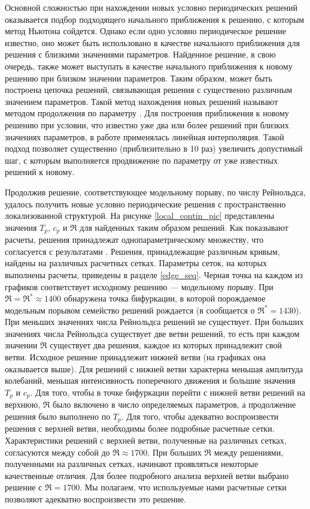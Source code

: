 Основной сложностью при нахождении новых условно периодических решений оказывается подбор подходящего начального приближения к решению, с которым метод Ньютона сойдется. Однако если одно условно периодическое решение известно, оно может быть использовано в качестве начального приближения для решения с близкими значениями параметров. Найденное решение, в свою очередь, также может выступать в качестве начального приближения к новому решению при близком значении параметров. Таким образом, может быть построена цепочка решений, связывающая решения с существенно различным значением параметров. Такой метод нахождения новых решений называют методом продолжения по параметру \cite{Viswanath2007, Dijkstra2014}. Для построения приближения к новому решению при условии, что известно уже два или более решений при близких значениях параметров, в работе применялась линейная интерполяция. Такой подход позволяет существенно (приблизительно в 10 раз) увеличить допустимый шаг, с которым выполняется продвижение по параметру от уже известных решений к новому. 

Продолжив решение, соответствующее модельному порыву, по числу Рейнольдса, удалось получить новые условно периодические решения с пространственно локализованной структурой. На рисунке \ref{local_contin_pic} представлены значения $T_p$, $c_p$ и $\Re$ для найденных таким образом решений. Как показывают расчеты, решения принадлежат однопараметрическому множеству, что согласуется с результатами \cite{Avila2013}. Решения, принадлежащие различным кривым, найдены на различных расчетных сетках. Параметры сеток, на которых выполнены расчеты, приведены в разделе \ref{edge_seq}. Черная точка на каждом из графиков соответствует исходному решению --- модельному порыву. При $\Re = \Re^* \approx 1400$ обнаружена точка бифуркации, в которой порождаемое модельным порывом семейство решений рождается (в \cite{Avila2013} сообщается о $\Re^* = 1430$). При меньших значениях числа Рейнольдса решений не существует. При больших значениях числа Рейнольдса существует две ветви решений, то есть при каждом значении $\Re$ существует два решения, каждое из которых принадлежит свой ветви. Исходное решение принадлежит нижней ветви (на графиках она оказывается выше). Для решений с нижней ветви характерна меньшая амплитуда колебаний, меньшая интенсивность поперечного движения и большие значения $T_p$ и $c_p$. Для того, чтобы в точке бифуркации перейти с нижней ветви решений на верхнюю, $\Re$ было включено в число определяемых параметров, а продолжение решения было выполнено по $T_p$. Для того, чтобы адекватно воспроизвести решения с верхней ветви, необходимы более подробные расчетные сетки. Характеристики решений с верхней ветви, полученные на различных сетках, согласуются между собой до $\Re \approx 1700$. При больших $\Re$ между решениями, полученными на различных сетках, начинают проявляться некоторые качественные отличия. Для более подробного анализа верхней ветви выбрано решение с $\Re = 1700$. Мы полагаем, что используемые нами расчетные сетки позволяют адекватно воспроизвести это решение. 


